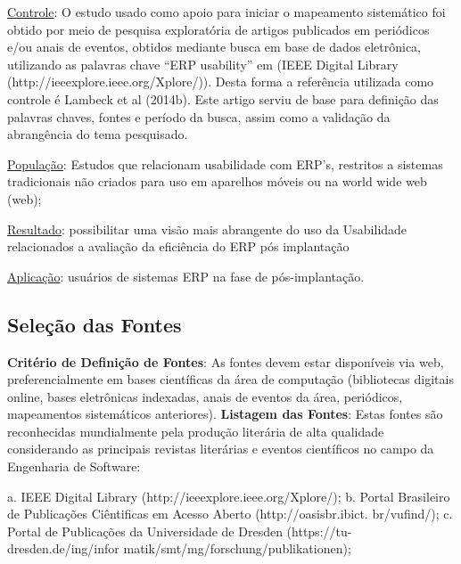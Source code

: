 \underline{Controle}: O estudo usado como apoio para iniciar o mapeamento sistemático foi obtido por meio de pesquisa exploratória de artigos publicados em periódicos e/ou anais de eventos, obtidos mediante busca em base de dados eletrônica, utilizando as palavras chave “ERP usability” em (IEEE Digital Library (http://ieeexplore.ieee.org/Xplore/)). Desta forma a referência utilizada como controle é  Lambeck et al (2014b). Este artigo serviu de base para definição das palavras chaves, fontes e período da busca, assim como a validação da abrangência do tema pesquisado.
\newline

\underline{População}: Estudos que relacionam usabilidade com ERP's, restritos a sistemas tradicionais não criados para uso em aparelhos móveis ou na world wide web (web);
\newline

\underline{Resultado}: possibilitar uma visão mais  abrangente do uso da Usabilidade relacionados a avaliação da eficiência do ERP pós implantação
\newline

\underline{Aplicação}: usuários de sistemas ERP na fase de pós-implantação.
\newline

\subsection{Seleção das Fontes}
\newline
\newline
\textbf{Critério de Definição de Fontes}: As fontes devem estar disponíveis via web, preferencialmente em bases científicas da área de computação (bibliotecas digitais online, bases eletrônicas indexadas, anais de eventos da área, periódicos, mapeamentos sistemáticos anteriores).
\newline
\newline
\textbf{Listagem das Fontes}: Estas fontes são reconhecidas mundialmente pela produção literária de alta qualidade considerando as principais revistas literárias e eventos científicos no campo da Engenharia de Software:

\indent a. IEEE Digital Library (http://ieeexplore.ieee.org/Xplore/);\newline
\indent b. Portal Brasileiro de Publicações Ciêntificas em Acesso Aberto (http://oasisbr.ibict. 
br/vufind/);\newline
\indent c. Portal de Publicações da Universidade de Dresden (https://tu-dresden.de/ing/infor
matik/smt/mg/forschung/publikationen);
\newline

